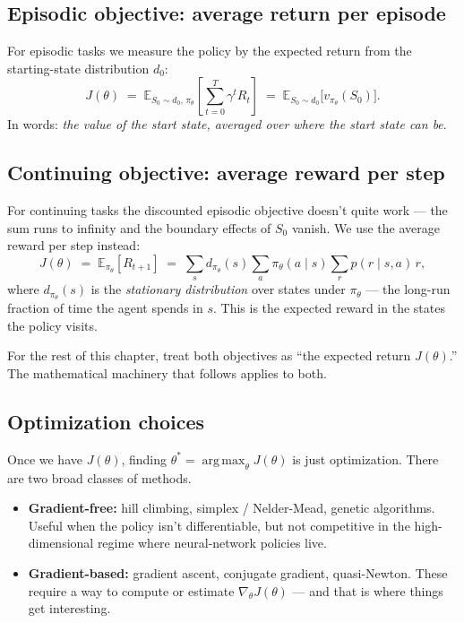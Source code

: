 \documentclass[11pt, oneside]{book}
\newcommand{\E}{\mathbb{E}}              %
\newcommand{\argmax}{\operatorname*{arg\,max}}
\begin{document}
\subsection{Episodic objective: average return per episode}

For episodic tasks we measure the policy by the expected return from the
starting-state distribution $d_0$:
\[
  J(\theta) \;=\; \E_{S_0 \sim d_0,\,\pi_\theta}\!\left[ \sum_{t=0}^{T} \gamma^t R_t \right]
            \;=\; \E_{S_0 \sim d_0}\!\bigl[ v_{\pi_\theta}(S_0) \bigr].
\]
In words: \emph{the value of the start state, averaged over where the start state can be}.

\subsection{Continuing objective: average reward per step}

For continuing tasks the discounted episodic objective doesn't quite work --- the sum
runs to infinity and the boundary effects of $S_0$ vanish.
We use the average reward per step instead:
\[
  J(\theta) \;=\; \E_{\pi_\theta}[R_{t+1}]
  \;=\; \sum_s d_{\pi_\theta}(s) \sum_a \pi_\theta(a \mid s) \sum_r p(r \mid s, a)\, r,
\]
where $d_{\pi_\theta}(s)$ is the \emph{stationary distribution} over states under
$\pi_\theta$ --- the long-run fraction of time the agent spends in $s$.
This is the expected reward in the states the policy visits.

For the rest of this chapter, treat both objectives as ``the expected return $J(\theta)$.''
The mathematical machinery that follows applies to both.

\subsection{Optimization choices}

Once we have $J(\theta)$, finding $\theta^* = \argmax_\theta J(\theta)$ is just
optimization. There are two broad classes of methods.
\begin{itemize}
  \item \textbf{Gradient-free:} hill climbing, simplex / Nelder-Mead, genetic algorithms.
    Useful when the policy isn't differentiable, but not competitive in the
    high-dimensional regime where neural-network policies live.
  \item \textbf{Gradient-based:} gradient ascent, conjugate gradient, quasi-Newton.
    These require a way to compute or estimate $\nabla_\theta J(\theta)$ --- and
    that is where things get interesting.
\end{itemize}
\end{document}
